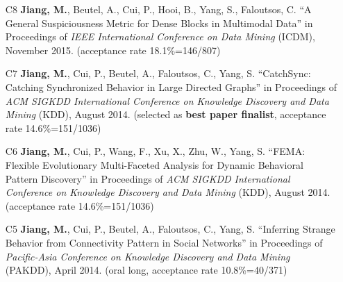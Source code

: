 \documentclass[10pt]{article}
\newenvironment{myindentpar}[1]%
{\begin{list}{}%
         {\setlength{\leftmargin}{#1}}%
         \item[]%
}
{\end{list}}
\newcounter{list}
\newcommand{\hide}[1]{}
\begin{document}
\begin{myindentpar}{0.00cm}
\begin{enumerate}[leftmargin=.5cm]
	\hide{\vspace{-0.1cm}\hspace{0.5cm}{\small \emph{I conceived the idea in consultation with Dr. Cui. I designed the study, completed the experiments, and wrote the paper.}}}

\item[C8] \textbf{Jiang, M.}, Beutel, A., Cui, P., Hooi, B., Yang, S., Faloutsos, C. ``A General Suspiciousness Metric for Dense Blocks in Multimodal Data'' in Proceedings of \emph{IEEE International Conference on Data Mining} (ICDM), November 2015. (acceptance rate 18.1\%=146/807)

	\hide{\vspace{-0.1cm}\hspace{0.5cm}{\small \emph{I conceived the idea in consultation with Dr. Beutel. I designed the study, completed the experiments, and wrote the paper. Dr. Beutel edited the paper.}}}

\item[C7] \textbf{Jiang, M.}, Cui, P., Beutel, A., Faloutsos, C., Yang, S. ``CatchSync: Catching Synchronized Behavior in Large Directed Graphs'' in Proceedings of \emph{ACM SIGKDD International Conference on Knowledge Discovery and Data Mining} (KDD), August 2014. (selected as \textbf{best paper finalist}, acceptance rate 14.6\%=151/1036)

	\hide{\vspace{-0.1cm}\hspace{0.5cm}{\small \emph{I conceived the idea in consultation with Dr. Faloutsos. I designed the study, did the experiments, and wrote the paper. Drs. Beutel and Faloutsos edited the paper.}}}

\item[C6] \textbf{Jiang, M.}, Cui, P., Wang, F., Xu, X., Zhu, W., Yang, S. ``FEMA: Flexible Evolutionary Multi-Faceted Analysis for Dynamic Behavioral Pattern Discovery'' in Proceedings of \emph{ACM SIGKDD International Conference on Knowledge Discovery and Data Mining} (KDD), August 2014. (acceptance rate 14.6\%=151/1036)

	\hide{\vspace{-0.1cm}\hspace{0.5cm}{\small \emph{I conceived the idea in consultation with Drs. Cui and Wang. I designed the study, completed the experiments, and wrote the paper.}}}

\item[C5] \textbf{Jiang, M.}, Cui, P., Beutel, A., Faloutsos, C., Yang, S. ``Inferring Strange Behavior from Connectivity Pattern in Social Networks'' in Proceedings of \emph{Pacific-Asia Conference on Knowledge Discovery and Data Mining } (PAKDD), April 2014. (oral long, acceptance rate 10.8\%=40/371)


\end{enumerate}
\end{myindentpar}
\end{document}
